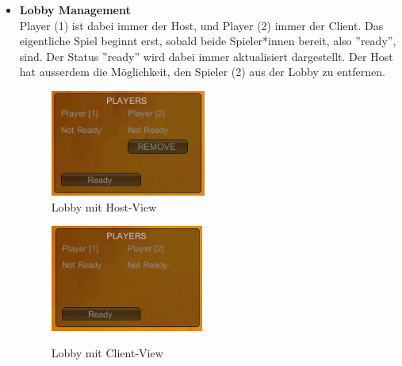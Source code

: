 \begin{itemize}
\begin {itemize}
        \item \textbf{Lobby Management}\\
            Player (1) ist dabei immer der Host, und Player (2) immer der Client. Das eigentliche Spiel beginnt erst, sobald beide Spieler*innen bereit, also ''ready'', sind. 
            Der Status ''ready'' wird dabei immer aktualisiert dargestellt. Der Host hat ausserdem die Möglichkeit, den Spieler (2) aus der Lobby zu entfernen. 
            \begin{figure}[H]
                \centering
                \begin{minipage}[H]{6.5cm}
                \centering
                \includegraphics[height=3.5cm]{resources/lobby.png}\\
                \caption{Lobby mit Host-View}
                \end{minipage}
                \begin{minipage}[H]{6.5cm}
                \centering
                \includegraphics[height=3.5cm]{resources/lobbyc.png}\\
                \caption{Lobby mit Client-View}
                \end{minipage}
            \end{figure}
            

\end{itemize}
\end{itemize}
